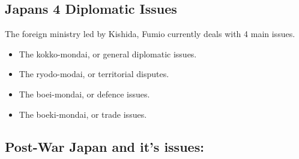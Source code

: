\documentclass{article}
\begin{document}
\subsection {Japans 4 Diplomatic Issues}
The foreign ministry led by Kishida, Fumio currently deals with 4 main issues.
\begin{itemize}
    \item The kokko-mondai, or general diplomatic issues.
    \item The ryodo-modai, or territorial disputes.
    \item The boei-mondai, or defence issues.
    \item The boeki-mondai, or trade issues.
\end{itemize}
\subsection{Post-War Japan and it's issues:}
\end{document}
